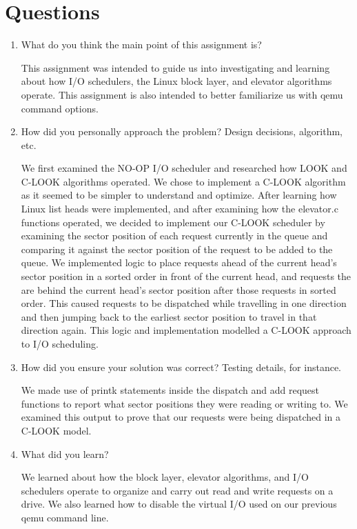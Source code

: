 \documentclass[letterpaper,10pt,fleqn]{article}
\begin{document}
\section*{Questions}
\begin{enumerate}
\item What do you think the main point of this assignment is?

This assignment was intended to guide us into investigating and learning about how I/O schedulers, the Linux block layer, and elevator algorithms operate. This assignment is also intended to better familiarize us with qemu command options.

\item How did you personally approach the problem? Design decisions, algorithm, etc. 

We first examined the NO-OP I/O scheduler and researched how LOOK and C-LOOK algorithms operated. We chose to implement a C-LOOK algorithm as it seemed to be simpler to understand and optimize. After learning how Linux list heads were implemented, and after examining how the elevator.c functions operated, we decided to implement our C-LOOK scheduler by examining the sector position of each request currently in the queue and comparing it against the sector position of the request to be added to the queue. We implemented logic to place requests ahead of the current head's sector position in a sorted order in front of the current head, and requests the are behind the current head's sector position after those requests in sorted order. This caused requests to be dispatched while travelling in one direction and then jumping back to the earliest sector position to travel in that direction again. This logic and implementation modelled a C-LOOK approach to I/O scheduling.

\item How did you ensure your solution was correct? Testing details, for instance. 

We made use of printk statements inside the dispatch and add request functions to report what sector positions they were reading or writing to. We examined this output to prove that our requests were being dispatched in a C-LOOK model.

\item What did you learn? 

We learned about how the block layer, elevator algorithms, and I/O schedulers operate to organize and carry out read and write requests on a drive. We also learned how to disable the virtual I/O used on our previous qemu command line.

\end{enumerate}

\begin{thebibliography}{9}

\end{thebibliography}
\end{document}
